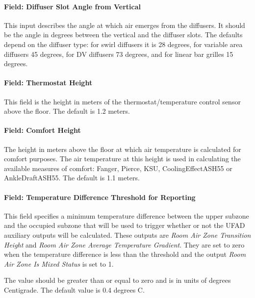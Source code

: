 \paragraph{Field: Diffuser Slot Angle from Vertical}\label{field-diffuser-slot-angle-from-vertical}

This input describes the angle at which air emerges from the diffusers. It should be the angle in degrees between the vertical and the diffuser slots. The defaults depend on the diffuser type: for swirl diffusers it is 28 degrees, for variable area diffusers 45 degrees, for DV diffusers 73 degrees, and for linear bar grilles 15 degrees.

\paragraph{Field: Thermostat Height}\label{field-thermostat-height-2}

This field is the height in meters of the thermostat/temperature control sensor above the floor. The default is 1.2 meters.

\paragraph{Field: Comfort Height}\label{field-comfort-height-1}

The height in meters above the floor at which air temperature is calculated for comfort purposes. The air temperature at this height is used in calculating the available measures of comfort: Fanger, Pierce, KSU, CoolingEffectASH55 or AnkleDraftASH55. The default is 1.1 meters.

\paragraph{Field: Temperature Difference Threshold for Reporting}\label{field-temperature-difference-threshold-for-reporting-1}

This field specifies a minimum temperature difference between the upper subzone and the occupied subzone that will be used to trigger whether or not the UFAD auxiliary outputs will be calculated. These outputs are \emph{Room Air Zone Transition Height} and \emph{Room Air Zone Average Temperature Gradient}. They are set to zero when the temperature difference is less than the threshold and the output \emph{Room Air Zone Is Mixed Status} is set to 1.

The value should be greater than or equal to zero and is in units of degrees Centigrade. The default value is 0.4 degrees C.

